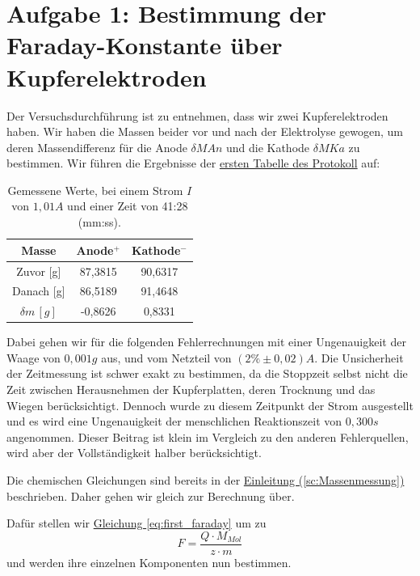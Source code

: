 \twocolumn

\section{Aufgabe 1: Bestimmung der Faraday-Konstante über Kupferelektroden}
Der Versuchsdurchführung ist zu entnehmen, dass wir zwei Kupferelektroden haben. Wir haben die Massen beider vor und nach der Elektrolyse gewogen, um deren Massendifferenz für die Anode $\delta M{An}$ und die Kathode $\delta M{Ka}$ zu bestimmen.
Wir führen die Ergebnisse der \hyperref[Protokoll]{ersten Tabelle des Protokoll} auf:
\begin{table}
    \begin{tabular}{c | c | c}
        \toprule
        Masse & Anode$^+$ & Kathode$^-$\\
        \hline
        Zuvor  [g] & 87,3815 & 90,6317 \\
        Danach [g] & 86,5189 & 91,4648 \\
        \midrule
        $\delta m \, [g]$ & -0,8626 & 0,8331\\
        \bottomrule
    \end{tabular}
    \label{tab:p_1}
    \caption{Gemessene Werte, bei einem Strom $I$ von $1,01A$ und einer Zeit von 41:28 (mm:ss).}
\end{table}

Dabei gehen wir für die folgenden Fehlerrechnungen mit einer Ungenauigkeit der Waage von $0,001g$ aus, und vom Netzteil von $(2\% \pm 0,02)A$.
Die Unsicherheit der Zeitmessung ist schwer exakt zu bestimmen, da die Stoppzeit selbst nicht die Zeit zwischen Herausnehmen der Kupferplatten, deren Trocknung und das Wiegen berücksichtigt.
Dennoch wurde zu diesem Zeitpunkt der Strom ausgestellt und es wird eine Ungenauigkeit der menschlichen Reaktionszeit von $0,300s$ angenommen. Dieser Beitrag ist klein im Vergleich zu den anderen Fehlerquellen, wird aber der Vollständigkeit halber berücksichtigt.

Die chemischen Gleichungen sind bereits in der \hyperref[sc:Massenmessung]{Einleitung (\ref*{sc:Massenmessung})} beschrieben. Daher gehen wir gleich zur Berechnung über.

Dafür stellen wir \hyperref[eq:first_faraday]{Gleichung \ref*{eq:first_faraday}} um zu
\begin{equation}
    F = \frac{Q \cdot M_{Mol}}{z \cdot m}
\end{equation}
und werden ihre einzelnen Komponenten nun bestimmen.

